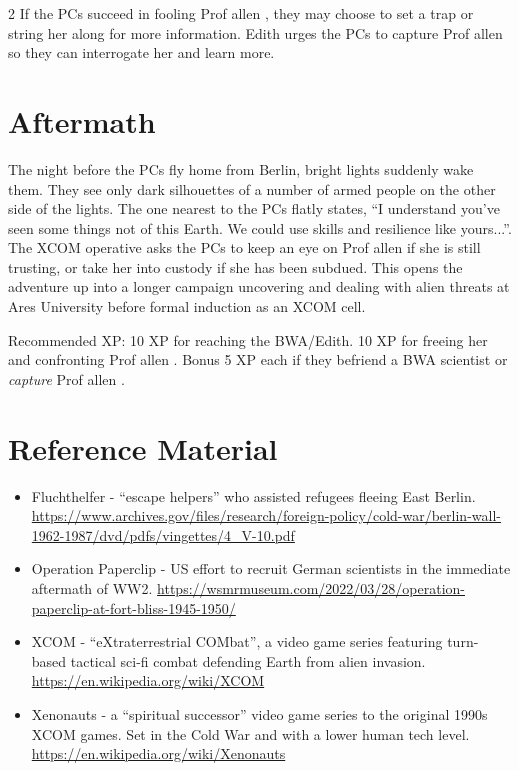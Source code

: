 \documentclass{book}
\newcommand{\prof}{
    {\color{brown} Prof allen}
}
\begin{document}
\begin{multicols*}{2}
If the PCs succeed in fooling \prof, they may choose to set a trap or string her along for more information.  Edith urges the PCs to capture \prof so they can interrogate her and learn more.

\section{Aftermath}

The night before the PCs fly home from Berlin, bright lights suddenly wake them. They see only dark silhouettes of a number of armed people on the other side of the lights.  The one nearest to the PCs flatly states, ``I understand you've seen some things not of this Earth.  We could use skills and resilience like yours...''.  The XCOM operative asks the PCs to keep an eye on \prof if she is still trusting, or take her into custody if she has been subdued.  This opens the adventure up into a longer campaign uncovering and dealing with alien threats at Ares University before formal induction as an XCOM cell.

Recommended XP: 10 XP for reaching the BWA/Edith.  10 XP for freeing her and confronting \prof.  Bonus 5 XP each if they befriend a BWA scientist or \emph{capture} \prof.

\section{Reference Material}

\begin{itemize}
    \setlength\itemsep{-.5em}
    \item Fluchthelfer - ``escape helpers'' who assisted refugees fleeing East Berlin.  \url{https://www.archives.gov/files/research/foreign-policy/cold-war/berlin-wall-1962-1987/dvd/pdfs/vingettes/4_V-10.pdf}
    \item Operation Paperclip - US effort to recruit German scientists in the immediate aftermath of WW2.  \url{https://wsmrmuseum.com/2022/03/28/operation-paperclip-at-fort-bliss-1945-1950/}
    \item XCOM - ``eXtraterrestrial COMbat'', a video game series featuring turn-based tactical sci-fi combat defending Earth from alien invasion.  \url{https://en.wikipedia.org/wiki/XCOM}
    \item Xenonauts - a ``spiritual successor'' video game series to the original 1990s XCOM games.  Set in the Cold War and with a lower human tech level.  \url{https://en.wikipedia.org/wiki/Xenonauts}
\end{itemize}


\end{multicols*}
\end{document}
